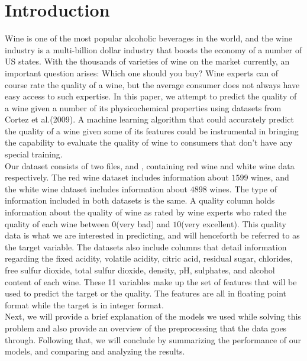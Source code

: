 \section{Introduction}
\label{sec:intro}
Wine is one of the most popular alcoholic beverages in the world, and the wine industry is a multi-billion dollar industry that boosts the economy of a number of US states. With the thousands of varieties of wine on the market currently, an important question arises: Which one should you buy? Wine experts can of course rate the quality of a wine, but the average consumer does not always have easy access to such expertise. In this paper, we attempt to predict the quality of a wine given a number of its physicochemical properties using datasets from Cortez et al.(2009). A machine learning algorithm that could accurately predict the quality of a wine given some of its features could be instrumental in bringing the capability to evaluate the quality of wine to consumers that don't have any special training.\\

Our dataset consists of two files,  and , containing red wine and white wine data respectively. The red wine dataset includes information about $1599$ wines, and the white wine dataset includes information about $4898$ wines. The type of information included in both datasets is the same. A quality column holds information about the quality of wine as rated by wine experts who rated the quality of each wine between $0$(very bad) and $10$(very excellent). This quality data is what we are interested in predicting, and will henceforth be referred to as the target variable. The datasets also include columns that detail information regarding the fixed acidity, volatile acidity, citric acid, residual sugar, chlorides, free sulfur dioxide, total sulfur dioxide, density, pH, sulphates, and alcohol content of each wine. These 11 variables make up the set of features that will be used to predict the target or the quality. The features are all in floating point format while the target is in integer format.\\

Next, we will provide a brief explanation of the models we used while solving this problem and also provide an overview of the preprocessing that the data goes through. Following that, we will conclude by summarizing the performance of our models, and comparing and analyzing the results.\\



